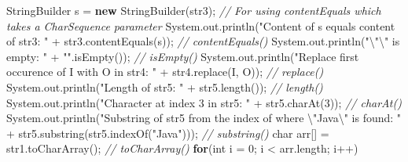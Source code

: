 \documentclass[
  12pt,
]{article}
\newenvironment{Shaded}{}{}
\newcommand{\BuiltInTok}[1]{\textcolor[rgb]{0.00,0.50,0.00}{#1}}
\newcommand{\CharTok}[1]{\textcolor[rgb]{0.25,0.44,0.63}{#1}}
\newcommand{\CommentTok}[1]{\textcolor[rgb]{0.38,0.63,0.69}{\textit{#1}}}
\newcommand{\ControlFlowTok}[1]{\textcolor[rgb]{0.00,0.44,0.13}{\textbf{#1}}}
\newcommand{\DataTypeTok}[1]{\textcolor[rgb]{0.56,0.13,0.00}{#1}}
\newcommand{\DecValTok}[1]{\textcolor[rgb]{0.25,0.63,0.44}{#1}}
\newcommand{\FunctionTok}[1]{\textcolor[rgb]{0.02,0.16,0.49}{#1}}
\newcommand{\KeywordTok}[1]{\textcolor[rgb]{0.00,0.44,0.13}{\textbf{#1}}}
\newcommand{\NormalTok}[1]{#1}
\newcommand{\OperatorTok}[1]{\textcolor[rgb]{0.40,0.40,0.40}{#1}}
\newcommand{\SpecialCharTok}[1]{\textcolor[rgb]{0.25,0.44,0.63}{#1}}
\newcommand{\StringTok}[1]{\textcolor[rgb]{0.25,0.44,0.63}{#1}}
\begin{document}
\begin{Shaded}
\begin{Highlighting}[numbers=left,,]
        \BuiltInTok{StringBuilder}\NormalTok{ s }\OperatorTok{=} \KeywordTok{new} \BuiltInTok{StringBuilder}\OperatorTok{(}\NormalTok{str3}\OperatorTok{);} \CommentTok{// For using contentEquals which takes a CharSequence parameter}
        \BuiltInTok{System}\OperatorTok{.}\FunctionTok{out}\OperatorTok{.}\FunctionTok{println}\OperatorTok{(}\StringTok{"Content of s equals content of str3: "} \OperatorTok{+}\NormalTok{ str3}\OperatorTok{.}\FunctionTok{contentEquals}\OperatorTok{(}\NormalTok{s}\OperatorTok{));} \CommentTok{// contentEquals()}
        \BuiltInTok{System}\OperatorTok{.}\FunctionTok{out}\OperatorTok{.}\FunctionTok{println}\OperatorTok{(}\StringTok{"}\SpecialCharTok{\textbackslash{}"\textbackslash{}"}\StringTok{ is empty: "} \OperatorTok{+} \StringTok{""}\OperatorTok{.}\FunctionTok{isEmpty}\OperatorTok{());} \CommentTok{// isEmpty()}
        \BuiltInTok{System}\OperatorTok{.}\FunctionTok{out}\OperatorTok{.}\FunctionTok{println}\OperatorTok{(}\StringTok{"Replace first occurence of I with O in str4: "} \OperatorTok{+}\NormalTok{ str4}\OperatorTok{.}\FunctionTok{replace}\OperatorTok{(}\CharTok{\textquotesingle{}I\textquotesingle{}}\OperatorTok{,} \CharTok{\textquotesingle{}O\textquotesingle{}}\OperatorTok{));} \CommentTok{// replace()}
        \BuiltInTok{System}\OperatorTok{.}\FunctionTok{out}\OperatorTok{.}\FunctionTok{println}\OperatorTok{(}\StringTok{"Length of str5: "} \OperatorTok{+}\NormalTok{ str5}\OperatorTok{.}\FunctionTok{length}\OperatorTok{());} \CommentTok{// length()}
        \BuiltInTok{System}\OperatorTok{.}\FunctionTok{out}\OperatorTok{.}\FunctionTok{println}\OperatorTok{(}\StringTok{"Character at index 3 in str5: "} \OperatorTok{+}\NormalTok{ str5}\OperatorTok{.}\FunctionTok{charAt}\OperatorTok{(}\DecValTok{3}\OperatorTok{));} \CommentTok{// charAt()}
        \BuiltInTok{System}\OperatorTok{.}\FunctionTok{out}\OperatorTok{.}\FunctionTok{println}\OperatorTok{(}\StringTok{"Substring of str5 from the index of where }\SpecialCharTok{\textbackslash{}"}\StringTok{Java}\SpecialCharTok{\textbackslash{}"}\StringTok{ is found: "} \OperatorTok{+}\NormalTok{ str5}\OperatorTok{.}\FunctionTok{substring}\OperatorTok{(}\NormalTok{str5}\OperatorTok{.}\FunctionTok{indexOf}\OperatorTok{(}\StringTok{"Java"}\OperatorTok{)));} \CommentTok{// substring()}
        \DataTypeTok{char}\NormalTok{ arr}\OperatorTok{[]} \OperatorTok{=}\NormalTok{ str1}\OperatorTok{.}\FunctionTok{toCharArray}\OperatorTok{();} \CommentTok{// toCharArray()}
        \ControlFlowTok{for}\OperatorTok{(}\DataTypeTok{int}\NormalTok{ i }\OperatorTok{=} \DecValTok{0}\OperatorTok{;}\NormalTok{ i }\OperatorTok{\textless{}}\NormalTok{ arr}\OperatorTok{.}\FunctionTok{length}\OperatorTok{;}\NormalTok{ i}\OperatorTok{++)}

\end{Highlighting}
\end{Shaded}
\end{document}
